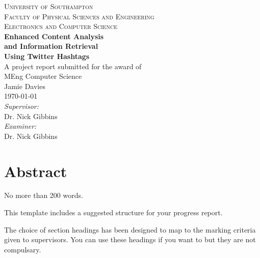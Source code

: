 \documentclass[12pt,a4paper]{article}
\begin{document}
\begin{titlepage}
\center

\textsc{\Large University of Southampton}\\[0.2cm]
\textsc{\large Faculty of Physical Sciences and Engineering}\\[0.1cm]
\textsc{\large Electronics and Computer Science}\\[2.5cm]

{\huge \bfseries Enhanced Content Analysis}\\[0.2cm]
{\huge \bfseries and Information Retrieval}\\[0.4cm]
{\huge \bfseries Using Twitter Hashtags}\\[2.5cm]

{\large A project report submitted for the award of}\\
{\large MEng Computer Science}\\[1.5cm]

{\Large Jamie Davies}\\[1.5cm]

{\large \today}\\[3.5cm]

\emph{Supervisor:}\\
Dr. Nick Gibbins\\[1cm]

\emph{Examiner:}\\
Dr. Nick Gibbins\\[3cm]


\vfill
\end{titlepage}

\setcounter{secnumdepth}{0}
\section{Abstract}
No more than 200 words.

This template includes a suggested structure for your progress report.

The choice of section headings has been designed to map to the marking criteria given to supervisors. You can use these headings if you want to but they are not compulsary.
\pagebreak
\end{document}
